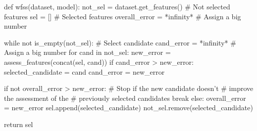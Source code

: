 \begin{code}[language = Python, frame = single,
  caption = {\textit{WFSS} pseudo code},
  label = lst:wfss-pseudo-code,
  captionpos = b][bth]
def wfss(dataset, model):
  not_sel = dataset.get_features() # Not selected features
  sel = [] # Selected features
  overall_error = *infinity* # Assign a big number
  
  while not is_empty(not_sel):
    # Select candidate
    cand_error = *infinity* # Assign a big number
    for cand in not_sel:
      new_error = assess_features(concat(sel, cand))
      if cand_error > new_error:
        selected_candidate = cand
        cand_error = new_error

    if not overall_error > new_error:
      # Stop if the new candidate doesn't
      # improve the assessment of the
      # previously selected candidates
      break
    else:
      overall_error = new_error
      sel.append(selected_candidate)
      not_sel.remove(selected_candidate)

  return sel
\end{code}



                
                


                







